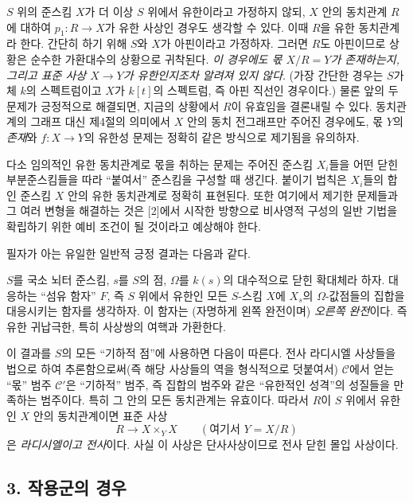 $S$ 위의 준스킴 $X$가 더 이상 $S$ 위에서 유한이라고 가정하지 않되,
$X$ 안의 동치관계 $R$에 대하여 $p_1:R\longrightarrow X$가 유한
사상인 경우도 생각할 수 있다. 이때 $R$을 유한 동치관계라 한다.
간단히 하기 위해 $S$와 $X$가 아핀이라고 가정하자. 그러면 $R$도
아핀이므로 상황은 순수한 가환대수의 상황으로 귀착된다. \emph{이
경우에도 몫 $X/R=Y$가 존재하는지, 그리고 표준 사상
$X\longrightarrow Y$가 유한인지조차 알려져 있지 않다}. (가장 간단한
경우는 $S$가 체 $k$의 스펙트럼이고 $X$가 $k[t]$의 스펙트럼, 즉 아핀
직선인 경우이다.) 물론 앞의 두 문제가 긍정적으로 해결되면, 지금의
상황에서 $R$이 유효임을 결론내릴 수 있다. 동치관계의 그래프 대신
제4절의 의미에서 $X$ 안의 동치 전그래프만 주어진 경우에도, 몫 $Y$의
\emph{존재}와 $f:X\longrightarrow Y$의 유한성 문제는 정확히 같은
방식으로 제기됨을 유의하자.

다소 임의적인 유한 동치관계로 몫을 취하는 문제는 주어진 준스킴
$X_i$들을 어떤 닫힌 부분준스킴들을 따라 ``붙여서'' 준스킴을 구성할
때 생긴다. 붙이기 법칙은 $X_i$들의 합인 준스킴 $X$ 안의 유한
동치관계로 정확히 표현된다. 또한 여기에서 제기한 문제들과 그 여러
변형을 해결하는 것은 [2]에서 시작한 방향으로 비사영적 구성의 일반
기법을 확립하기 위한 예비 조건이 될 것이라고 예상해야 한다.

필자가 아는 유일한 일반적 긍정 결과는 다음과 같다.

 $S$를 국소 뇌터 준스킴, $s$를 $S$의 점,
$\Omega$를 $k(s)$의 대수적으로 닫힌 확대체라 하자. 대응하는
``섬유 함자'' $F$, 즉 $S$ 위에서 유한인 모든 $S$-스킴
$X$에 $X_s$의 $\Omega$-값점들의 집합을 대응시키는 함자를 생각하자.
이 함자는 (자명하게 왼쪽 완전이며) \emph{오른쪽 완전}이다. 즉 유한
귀납극한, 특히 사상쌍의 여핵과 가환한다.

이 결과를 $S$의 모든 ``기하적 점''에 사용하면 다음이 따른다.
전사 라디시엘 사상들을 법으로 하여 추론함으로써(즉 해당 사상들의
역을 형식적으로 덧붙여서) $\mathcal C$에서 얻는 ``몫'' 범주
$\mathcal C'$은 ``기하적'' 범주, 즉 집합의 범주와 같은 ``유한적인
성격''의 성질들을 만족하는 범주이다. 특히 그 안의 모든 동치관계는
유효이다. 따라서 $R$이 $S$ 위에서 유한인 $X$ 안의 동치관계이면
표준 사상
\[
  R\longrightarrow X\times_Y X\qquad (\text{여기서 }Y=X/R)
\]
은 \emph{라디시엘이고 전사}이다. 사실 이 사상은 단사사상이므로
전사 닫힌 몰입 사상이다.

\subsection*{3. 작용군의 경우}

